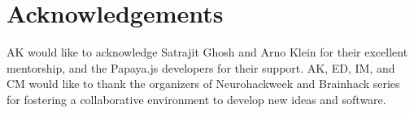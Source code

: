 \section{Acknowledgements}
AK would like to acknowledge Satrajit Ghosh and Arno Klein for their excellent mentorship, and the Papaya.js developers for their support. AK, ED, IM, and CM would like to thank the organizers of Neurohackweek and Brainhack series for fostering a collaborative environment to develop new ideas and software. 

